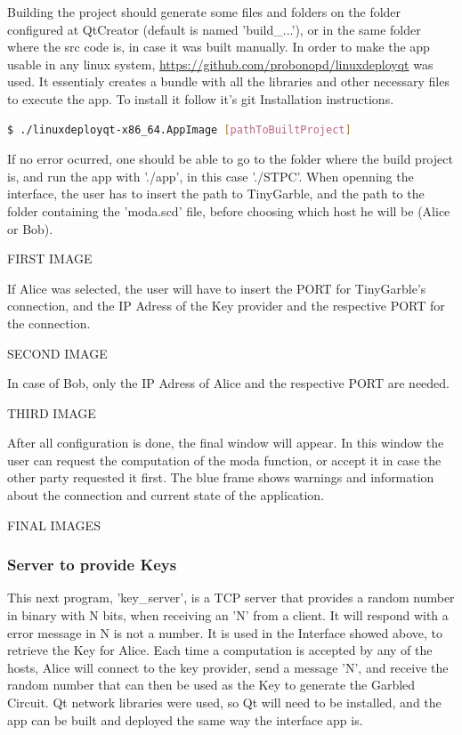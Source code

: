 \begin{refsection}
Building the project should generate some files and folders on the folder configured at QtCreator (default is named 'build\_...'), or in the same folder where the src code is, in case it was built manually.
In order to make the app usable in any linux system, \url{https://github.com/probonopd/linuxdeployqt} was used. It essentialy creates a bundle with all the libraries and other necessary files to execute the app. To install it follow it's git Installation instructions. 

\begin{lstlisting}[caption={Deploying QT application}, language=bash, captionpos=b]
$ ./linuxdeployqt-x86_64.AppImage [pathToBuiltProject]
\end{lstlisting}

If no error ocurred, one should be able to go to the folder where the build project is, and run the app with './app', in this case './STPC'.
When openning the interface, the user has to insert the path to TinyGarble, and the path to the folder containing the 'moda.scd' file, before choosing which host he will be (Alice or Bob).

FIRST IMAGE

If Alice was selected, the user will have to insert the PORT for TinyGarble's connection, and the IP Adress of the Key provider and the respective PORT for the connection.

SECOND IMAGE

In case of Bob, only the IP Adress of Alice and the respective PORT are needed.

THIRD IMAGE

After all configuration is done, the final window will appear. In this window the user can request the computation of the moda function, or accept it in case the other party requested it first.
The blue frame shows warnings and information about the connection and current state of the application.

FINAL IMAGES 

\newpage

\subsubsection{Server to provide Keys}

This next program, 'key\_server', is a TCP server that provides a random number in binary with N bits, when receiving an 'N' from a client. It will respond with a error message in N is not a number.
It is used in the Interface showed above, to retrieve the Key for Alice. Each time a computation is accepted by any of the hosts, Alice will connect to the key provider, send a message 'N', and receive the random number that can then be used as the Key to generate the Garbled Circuit.
Qt network libraries were used, so Qt will need to be installed, and the app can be built and deployed the same way the interface app is.


\end{refsection}
